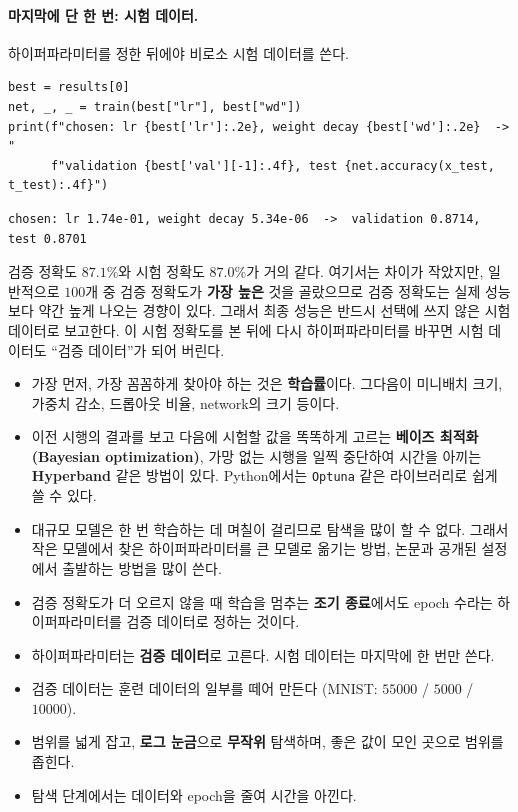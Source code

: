 \documentclass[11pt,a4paper]{article}
\begin{document}
\paragraph{마지막에 단 한 번: 시험 데이터.}
하이퍼파라미터를 정한 뒤에야 비로소 시험 데이터를 쓴다.
\begin{lstlisting}
best = results[0]
net, _, _ = train(best["lr"], best["wd"])
print(f"chosen: lr {best['lr']:.2e}, weight decay {best['wd']:.2e}  ->  "
      f"validation {best['val'][-1]:.4f}, test {net.accuracy(x_test, t_test):.4f}")
\end{lstlisting}
\begin{lstlisting}[language={},numbers=none]
chosen: lr 1.74e-01, weight decay 5.34e-06  ->  validation 0.8714, test 0.8701
\end{lstlisting}
검증 정확도 $87.1\%$와 시험 정확도 $87.0\%$가 거의 같다.
여기서는 차이가 작았지만, 일반적으로 $100$개 중 검증 정확도가 \textbf{가장 높은} 것을 골랐으므로
검증 정확도는 실제 성능보다 약간 높게 나오는 경향이 있다.
그래서 최종 성능은 반드시 선택에 쓰지 않은 시험 데이터로 보고한다.
이 시험 정확도를 본 뒤에 다시 하이퍼파라미터를 바꾸면 시험 데이터도 ``검증 데이터''가 되어 버린다.

\begin{remarkbox}
\begin{itemize}[leftmargin=1.5em]
\item 가장 먼저, 가장 꼼꼼하게 찾아야 하는 것은 \textbf{학습률}이다.
그다음이 미니배치 크기, 가중치 감소, 드롭아웃 비율, network의 크기 등이다.
\item 이전 시행의 결과를 보고 다음에 시험할 값을 똑똑하게 고르는 \textbf{베이즈 최적화(Bayesian optimization)},
가망 없는 시행을 일찍 중단하여 시간을 아끼는 \textbf{Hyperband} 같은 방법이 있다.
Python에서는 \texttt{Optuna} 같은 라이브러리로 쉽게 쓸 수 있다.
\item 대규모 모델은 한 번 학습하는 데 며칠이 걸리므로 탐색을 많이 할 수 없다.
그래서 작은 모델에서 찾은 하이퍼파라미터를 큰 모델로 옮기는 방법,
논문과 공개된 설정에서 출발하는 방법을 많이 쓴다.
\item 검증 정확도가 더 오르지 않을 때 학습을 멈추는 \textbf{조기 종료}에서도 epoch 수라는 하이퍼파라미터를 검증 데이터로 정하는 것이다.
\end{itemize}
\end{remarkbox}

\begin{keybox}[하이퍼파라미터 찾기: 정리]
\begin{itemize}[leftmargin=1.5em]
\item 하이퍼파라미터는 \textbf{검증 데이터}로 고른다. 시험 데이터는 마지막에 한 번만 쓴다.
\item 검증 데이터는 훈련 데이터의 일부를 떼어 만든다 (MNIST: $55000$ / $5000$ / $10000$).
\item 범위를 넓게 잡고, \textbf{로그 눈금}으로 \textbf{무작위} 탐색하며, 좋은 값이 모인 곳으로 범위를 좁힌다.
\item 탐색 단계에서는 데이터와 epoch을 줄여 시간을 아낀다.
\end{itemize}
\end{keybox}
\end{document}
